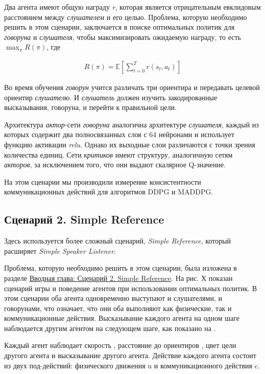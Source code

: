 Два агента имеют общую награду \textit{r}, которая является отрицательным евклидовым расстоянием между \textit{слушателем} и его целью. Проблема, которую необходимо решить в этом сценарии, заключается в поиске оптимальных политик для \textit{говоруна} и \textit{слушателя}, чтобы максимизировать ожидаемую награду, то есть $\max_{\pi}R(\pi)$, где

\begin{equation}
    \begin{multlined}
        R(\pi) = \mathbb{E}[\sum_{t=0}^{T}r(s_t, a_t)]
    \end{multlined}
\end{equation}

Во время обучения \textit{говорун} учится различать три ориентира и передавать целевой ориентир \textit{слушателю}. И \textit{слушатель} должен изучить закодированные высказывания, говоруна, и перейти к правильной цели.

Архитектура \textit{актор}-сети \textit{говоруна} аналогична архитектуре \textit{слушателя}, каждый из которых содержит два полносвязанных слоя с 64 нейронами и использует функцию активации \textit{relu}. Однако их выходные слои различаются с точки зрения количества единиц. Сети \textit{критиков} имеют структуру, аналогичную сетям \textit{акторов}, за исключением того, что они выдают скалярное Q-значение.

На этом сценарии мы производили измерение консистентности коммуникационных действий для алгоритмов DDPG и MADDPG.

\subsection{Сценарий 2. Simple Reference} \label{exp-sr}

Здесь используется более сложный сценарий, \textit{Simple Reference}, который расширяет \textit{Simple Speaker Listener}.

Проблема, которую необходимо решить в этом сценарии, была изложена в разделе \hyperref[intro-sr]{Вводная глава: Сценарий 2. Simple Reference}. На рис. Х показан сценарий игры и поведение агентов при использовании оптимальных политик. В этом сценарии оба агента одновременно выступают и слушателями, и говорунами, что означает, что они оба выполняют как физические, так и коммуникационные действия. Высказывание каждого агента на одном шаге наблюдается другим агентом на следующем шаге, как показано на . %

Каждый агент наблюдает скорость , расстояние до ориентиров , цвет цели другого агента и высказывание другого агента. Действие каждого агента состоит из двух под-действий: физического движения u и коммуникационного действия c.

